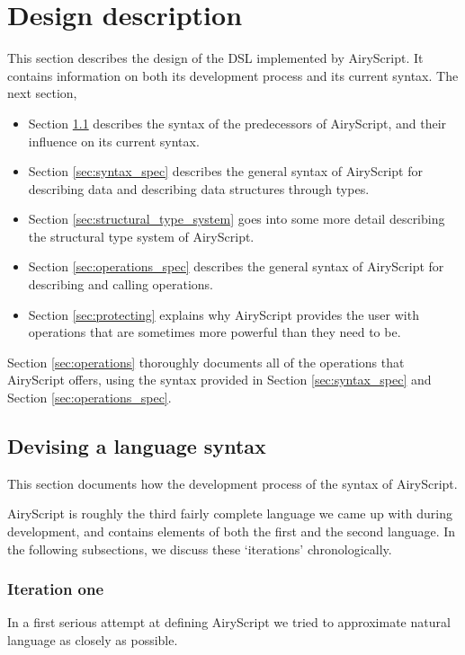 \section{Design description}
This section describes the design of the DSL implemented by AiryScript. It
contains information on both its development process and its current syntax. The
next section,
\begin{itemize}
  \item Section \ref{sec:devising_syntax} describes the syntax of the
    predecessors of AiryScript, and their influence on its current syntax.
%
  \item Section \ref{sec:syntax_spec} describes the general syntax of AiryScript
    for describing data and describing data structures through types.
%
  \item Section \ref{sec:structural_type_system} goes into some more detail
    describing the structural type system of AiryScript.
%
  \item Section \ref{sec:operations_spec} describes the general syntax of
    AiryScript for describing and calling operations.
%
  \item Section \ref{sec:protecting} explains why AiryScript provides the user
    with operations that are sometimes more powerful than they need to be.
\end{itemize}

\noindent
Section \ref{sec:operations} thoroughly documents all of the operations that
AiryScript offers, using the syntax provided in Section \ref{sec:syntax_spec}
and Section \ref{sec:operations_spec}.

\subsection{Devising a language syntax}
\label{sec:devising_syntax}
This section documents how the development process of the syntax of AiryScript.

AiryScript is roughly the third fairly complete language we came up with during
development, and contains elements of both the first and the second language. In
the following subsections, we discuss these ‘iterations’ chronologically.

\subsubsection{Iteration one}
In a first serious attempt at defining AiryScript we tried to approximate
natural language as closely as possible.

